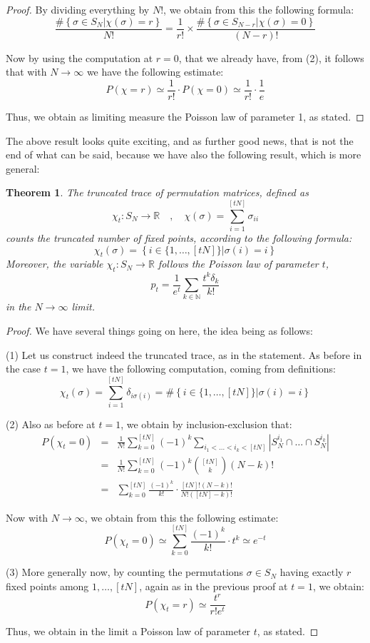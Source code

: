 \documentclass[12pt]{amsbook}
\newtheorem{theorem}{Theorem}[chapter]
\begin{document}
\begin{proof}
By dividing everything by $N!$, we obtain from this the following formula:
$$\frac{\#\left\{\sigma\in S_N\Big|\chi(\sigma)=r\right\}}{N!}=\frac{1}{r!}\times\frac{\#\left\{\sigma\in S_{N-r}\Big|\chi(\sigma)=0\right\}}{(N-r)!}$$

Now by using the computation at $r=0$, that we already have, from (2), it follows that with $N\to\infty$ we have the following estimate:
$$P(\chi=r)
\simeq\frac{1}{r!}\cdot P(\chi=0)
\simeq\frac{1}{r!}\cdot\frac{1}{e}$$

Thus, we obtain as limiting measure the Poisson law of parameter 1, as stated.
\end{proof}

The above result looks quite exciting, and as further good news, that is not the end of what can be said, because we have also the following result, which is more general:

\begin{theorem}
The truncated trace of permutation matrices, defined as
$$\chi_t:S_N\to\mathbb R\quad,\quad \chi(\sigma)=\sum_{i=1}^{[tN]}\sigma_{ii}$$
counts the truncated number of fixed points, according to the following formula:
$$\chi_t(\sigma)=\left\{i\in\{1,\ldots,[tN]\}\Big|\sigma(i)=i\right\}$$
Moreover, the variable $\chi_t:S_N\to\mathbb R$ follows the Poisson law of parameter $t$,
$$p_t=\frac{1}{e^t}\sum_{k\in\mathbb N}\frac{t^k\delta_k}{k!}$$
in the $N\to\infty$ limit. 
\end{theorem}

\begin{proof}
We have several things going on here, the idea being as follows:

\medskip

(1) Let us construct indeed the truncated trace, as in the statement. As before in the case $t=1$, we have the following computation, coming from definitions:
$$\chi_t(\sigma)
=\sum_{i=1}^{[tN]}\delta_{i\sigma(i)}
=\#\left\{i\in\{1,\ldots,[tN]\}\Big|\sigma(i)=i\right\}$$

(2) Also as before at $t=1$, we obtain by inclusion-exclusion that:
\begin{eqnarray*}
P(\chi_t=0)
&=&\frac{1}{N!}\sum_{k=0}^{[tN]}(-1)^k\sum_{i_1<\ldots<i_k<[tN]}|S_N^{i_1}\cap\ldots\cap S_N^{i_k}|\\
&=&\frac{1}{N!}\sum_{k=0}^{[tN]}(-1)^k\binom{[tN]}{k}(N-k)!\\
&=&\sum_{k=0}^{[tN]}\frac{(-1)^k}{k!}\cdot\frac{[tN]!(N-k)!}{N!([tN]-k)!}
\end{eqnarray*}

Now with $N\to\infty$, we obtain from this the following estimate:
$$P(\chi_t=0)
\simeq\sum_{k=0}^{[tN]}\frac{(-1)^k}{k!}\cdot t^k
\simeq e^{-t}$$

(3) More generally now, by counting the permutations $\sigma\in S_N$ having exactly $r$ fixed points among $1,\ldots,[tN]$, again as in the previous proof at $t=1$, we obtain:
$$P(\chi_t=r)\simeq\frac{t^r}{r!e^t}$$

Thus, we obtain in the limit a Poisson law of parameter $t$, as stated.
\end{proof}
\end{document}

